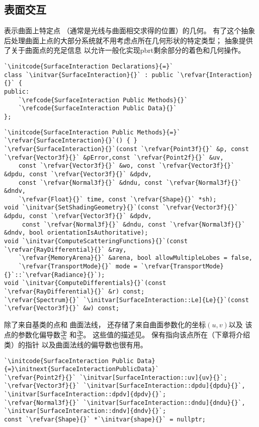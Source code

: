 \subsection{表面交互}\label{sub:表面交互}
表示曲面上特定点
（通常是光线与曲面相交求得的位置）的几何。
有了这个抽象后处理曲面上点的大部分系统就不用考虑点所在几何形状的特定类型；
抽象提供了关于曲面点的充足信息
以允许一般化实现pbrt剩余部分的着色和几何操作。
\begin{lstlisting}
`\initcode{SurfaceInteraction Declarations}{=}`
class `\initvar{SurfaceInteraction}{}` : public `\refvar{Interaction}{}` {
public:
    `\refcode{SurfaceInteraction Public Methods}{}`
    `\refcode{SurfaceInteraction Public Data}{}`
};
\end{lstlisting}
\begin{lstlisting}
`\initcode{SurfaceInteraction Public Methods}{=}`
`\refvar{SurfaceInteraction}{}`() { }
`\refvar{SurfaceInteraction}{}`(const `\refvar{Point3f}{}` &p, const `\refvar{Vector3f}{}` &pError,const `\refvar{Point2f}{}` &uv,
    const `\refvar{Vector3f}{}` &wo, const `\refvar{Vector3f}{}` &dpdu, const `\refvar{Vector3f}{}` &dpdv,
    const `\refvar{Normal3f}{}` &dndu, const `\refvar{Normal3f}{}` &dndv,
    `\refvar{Float}{}` time, const `\refvar{Shape}{}` *sh);
void `\initvar{SetShadingGeometry}{}`(const `\refvar{Vector3f}{}` &dpdu, const `\refvar{Vector3f}{}` &dpdv,
     const `\refvar{Normal3f}{}` &dndu, const `\refvar{Normal3f}{}` &dndv, bool orientationIsAuthoritative);
void `\initvar{ComputeScatteringFunctions}{}`(const `\refvar{RayDifferential}{}` &ray,
    `\refvar{MemoryArena}{}` &arena, bool allowMultipleLobes = false,
    `\refvar{TransportMode}{}` mode = `\refvar{TransportMode}{}`::`\refvar{Radiance}{}`);
void `\initvar{ComputeDifferentials}{}`(const `\refvar{RayDifferential}{}` &r) const;
`\refvar{Spectrum}{}` `\initvar[SurfaceInteraction::Le]{Le}{}`(const `\refvar{Vector3f}{}` &w) const;
\end{lstlisting}

除了来自基类的点和
曲面法线，
还存储了来自曲面参数化的坐标$(u,v)$以及
该点的参数化偏导数$\displaystyle\frac{\partial \bm p}{\partial u}$
和$\displaystyle\frac{\partial \bm p}{\partial v}$。
这些值的描述见。
保有指向该点所在（下章将介绍类）的指针
以及曲面法线的偏导数也很有用。
\begin{lstlisting}
`\initcode{SurfaceInteraction Public Data}{=}\initnext{SurfaceInteractionPublicData}`
`\refvar{Point2f}{}` `\initvar[SurfaceInteraction::uv]{uv}{}`;
`\refvar{Vector3f}{}` `\initvar[SurfaceInteraction::dpdu]{dpdu}{}`, `\initvar[SurfaceInteraction::dpdv]{dpdv}{}`;
`\refvar{Normal3f}{}` `\initvar[SurfaceInteraction::dndu]{dndu}{}`, `\initvar[SurfaceInteraction::dndv]{dndv}{}`;
const `\refvar{Shape}{}` *`\initvar{shape}{}` = nullptr;
\end{lstlisting}

